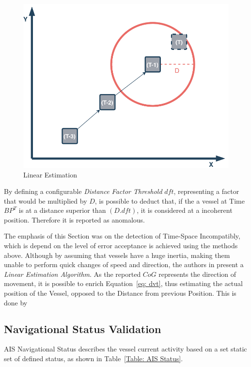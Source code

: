 \begin{figure}[H]
\centering
\includegraphics[scale = .6]{figures/Ch4/DVT.pdf}
\caption{Linear Estimation}
\label{fig: dvt}
\end{figure}

By defining a configurable \emph{Distance Factor Threshold} $dft$, representing a factor that would be multiplied by $D$, is possible to deduct that, if the a vessel at Time $BP^{T}$ is at a distance superior than $(D.dft)$, it is considered at a incoherent position. Therefore it is reported as anomalous.

The emphasis of this Section was on the detection of Time-Space Incompatibly, which is depend on the level of error acceptance is achieved using the methods above. 
Although by assuming that vessels have a huge inertia, making them unable to perform quick changes of speed and direction, the authors in \cite{Sadowski2015AlgorithmsCompression} present a \emph{Linear Estimation Algorithm}.
As the reported $CoG$ represents the direction of movement, it is possible to enrich Equation~\ref{eq: dvt}, thus estimating the actual position of the Vessel, opposed to the Distance from previous Position. This is done by 



\subsection{Navigational Status Validation}
\label{subsection: 4 Navigational Status Validation}
AIS Navigational Status describes the vessel current activity based on a set static set of defined status, as shown in Table~\ref{Table: AIS Status}.

